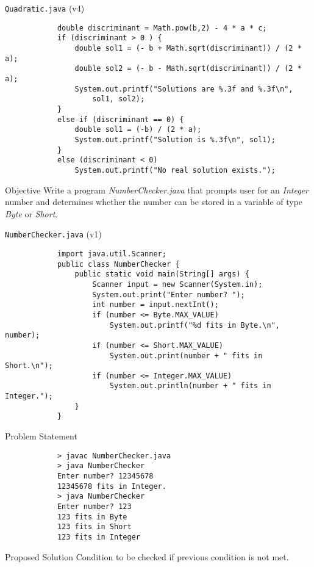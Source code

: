 \documentclass[10pt, compress]{beamer}
\begin{document}
\begin{slide}
	\begin{block}{\texttt{Quadratic.java} (v4)}
		\begin{verbatim}
			double discriminant = Math.pow(b,2) - 4 * a * c;
			if (discriminant > 0 ) {
			    double sol1 = (- b + Math.sqrt(discriminant)) / (2 * a);
			    double sol2 = (- b - Math.sqrt(discriminant)) / (2 * a);
			    System.out.printf("Solutions are %.3f and %.3f\n",
			        sol1, sol2);
			}
			else if (discriminant == 0) {
			    double sol1 = (-b) / (2 * a);
			    System.out.printf("Solution is %.3f\n", sol1);
			}
			else (discriminant < 0)
			    System.out.printf("No real solution exists.");
		\end{verbatim}
	\end{block}
\end{slide}

\begin{slide}
	\begin{block}{Objective}
		Write a program \textit{NumberChecker.java} that prompts user for an \textit{Integer} number and determines whether the number can be stored in a variable of type \textit{Byte} or \textit{Short}.
	\end{block}
\end{slide}

\begin{slide}
	\begin{block}{\texttt{NumberChecker.java} (v1)}
		\begin{verbatim}
			import java.util.Scanner;
			public class NumberChecker {
			    public static void main(String[] args) {
			        Scanner input = new Scanner(System.in);
			        System.out.print("Enter number? ");
			        int number = input.nextInt();
			        if (number <= Byte.MAX_VALUE)
			            System.out.printf("%d fits in Byte.\n", number);
			        if (number <= Short.MAX_VALUE)
			            System.out.print(number + " fits in Short.\n");
			        if (number <= Integer.MAX_VALUE)
			            System.out.println(number + " fits in Integer.");
			    }
			}
		\end{verbatim}
	\end{block}
\end{slide}

\begin{slide}
	\begin{block}{Problem Statement}
		\begin{verbatim}
			> javac NumberChecker.java
			> java NumberChecker
			Enter number? 12345678
			12345678 fits in Integer.
			> java NumberChecker
			Enter number? 123
			123 fits in Byte
			123 fits in Short
			123 fits in Integer
		\end{verbatim}
	\end{block}
	\begin{block}{Proposed Solution}
		Condition to be checked if previous condition is not met.
	\end{block}
\end{slide}
\end{document}
